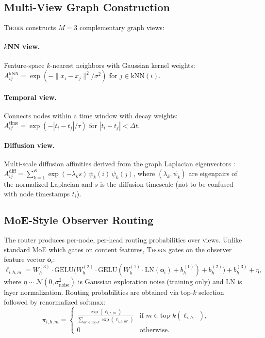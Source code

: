 \documentclass[11pt,a4paper]{article}
\newcommand{\thorn}{\textsc{Thorn}}
\begin{document}
\subsection{Multi-View Graph Construction}
\label{sec:views}

\thorn{} constructs $M = 3$ complementary graph views:

\paragraph{$k$NN view.}
Feature-space $k$-nearest neighbors with Gaussian kernel weights:
$A_{ij}^{\text{kNN}} = \exp(-\|x_i - x_j\|^2 / \sigma^2)$
for $j \in \text{kNN}(i)$.

\paragraph{Temporal view.}
Connects nodes within a time window with decay weights:
$A_{ij}^{\text{time}} = \exp(-|t_i - t_j| / \tau)$
for $|t_i - t_j| < \Delta t$.

\paragraph{Diffusion view.}
Multi-scale diffusion affinities derived from the graph Laplacian
eigenvectors \citep{coifman2006diffusion}:
$A_{ij}^{\text{diff}} = \sum_{k=1}^{K} \exp(-\lambda_k s)\,
\psi_k(i)\,\psi_k(j)$,
where $(\lambda_k, \psi_k)$ are eigenpairs of the normalized Laplacian
and $s$ is the diffusion timescale (not to be confused with node
timestamps $t_i$).

\subsection{MoE-Style Observer Routing}
\label{sec:routing}

The router produces per-node, per-head routing probabilities over views.
Unlike standard MoE which gates on content features, \thorn{} gates on
the observer feature vector $\mathbf{o}_i$:
\begin{equation}
  \label{eq:routing}
  \ell_{i,h,m} = W_h^{(3)} \cdot \mathrm{GELU}\!\big(
    W_h^{(2)} \cdot \mathrm{GELU}(
    W_h^{(1)} \cdot \mathrm{LN}(\mathbf{o}_i) + b_h^{(1)}
  ) + b_h^{(2)}\big) + b_h^{(3)} + \eta,
\end{equation}
where $\eta \sim \mathcal{N}(0, \sigma_{\text{noise}}^2)$ is Gaussian
exploration noise (training only) and $\mathrm{LN}$ is layer
normalization.
Routing probabilities are obtained via top-$k$ selection followed by
renormalized softmax:
\begin{equation}
  \label{eq:topk}
  \pi_{i,h,m} =
  \begin{cases}
    \frac{\exp(\ell_{i,h,m})}{\sum_{m' \in \text{top-}k}
      \exp(\ell_{i,h,m'})} & \text{if } m \in \text{top-}k(\ell_{i,h,\cdot}), \\
    0 & \text{otherwise}.
  \end{cases}
\end{equation}
\end{document}
